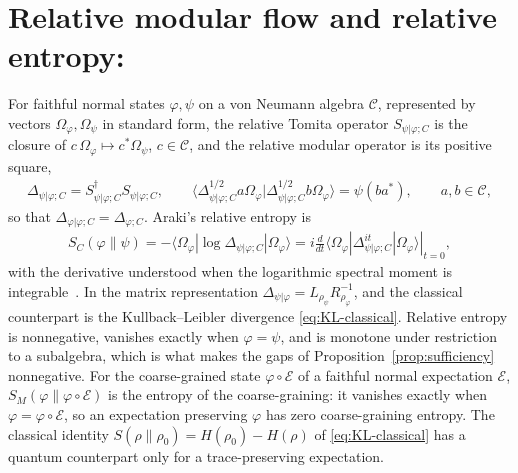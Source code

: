 \documentclass[a4paper,11pt]{article}
\theoremstyle{definition}
\newcommand{\mE}{\mathcal{E}}
\begin{document}
\section{Relative modular flow and relative entropy:}
For faithful normal states $\varphi,\psi$ on a von Neumann algebra $\mathcal C$, represented by vectors $\Omega_\varphi,\Omega_\psi$ in standard form, the relative Tomita operator $S_{\psi|\varphi;C}$ is the closure of $c\,\Omega_\varphi\mapsto c^*\Omega_\psi$, $c\in\mathcal C$, and the relative modular operator is its positive square,
\begin{align}
 \Delta_{\psi|\varphi;C}=S_{\psi|\varphi;C}^\dagger S_{\psi|\varphi;C},
 \qquad
 \langle\Delta_{\psi|\varphi;C}^{1/2}a\Omega_\varphi|\Delta_{\psi|\varphi;C}^{1/2}b\Omega_\varphi\rangle=\psi(ba^*),\qquad a,b\in\mathcal C,
 \label{eq:relative-modular}
\end{align}
so that $\Delta_{\varphi|\varphi;C}=\Delta_{\varphi;C}$. Araki's relative entropy is
\begin{align}
 S_C(\varphi\|\psi)
 =-\langle\Omega_\varphi|\log\Delta_{\psi|\varphi;C}|\Omega_\varphi\rangle
 =i\left.\frac{d}{dt}\langle\Omega_\varphi|\Delta_{\psi|\varphi;C}^{it}|\Omega_\varphi\rangle\right|_{t=0},
 \label{eq:relative-entropy}
\end{align}
with the derivative understood when the logarithmic spectral moment is integrable~\cite{Araki1976,Araki1977}. In the matrix representation $\Delta_{\psi|\varphi}=L_{\rho_\psi}R_{\rho_\varphi}^{-1}$, and the classical counterpart is the Kullback--Leibler divergence \eqref{eq:KL-classical}. Relative entropy is nonnegative, vanishes exactly when $\varphi=\psi$, and is monotone under restriction to a subalgebra, which is what makes the gaps of Proposition~\ref{prop:sufficiency} nonnegative. For the coarse-grained state $\varphi\circ\mE$ of a faithful normal expectation $\mE$, $S_M(\varphi\|\varphi\circ\mE)$ is the entropy of the coarse-graining: it vanishes exactly when $\varphi=\varphi\circ\mE$, so an expectation preserving $\varphi$ has zero coarse-graining entropy. The classical identity $S(\rho\|\rho_0)=H(\rho_0)-H(\rho)$ of \eqref{eq:KL-classical} has a quantum counterpart only for a trace-preserving expectation.



\end{document}
